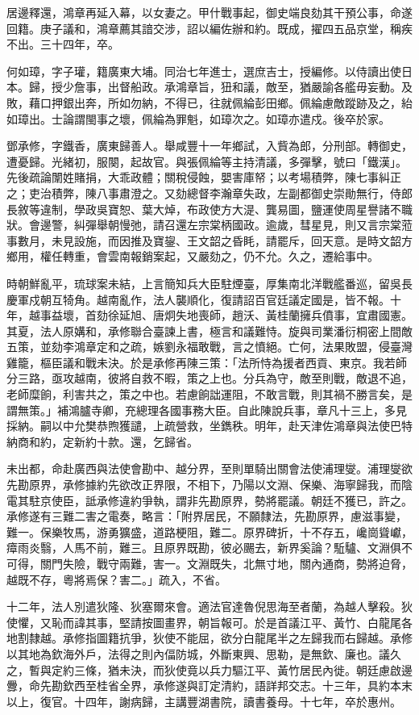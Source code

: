 \begin{pinyinscope}
居邊釋還，鴻章再延入幕，以女妻之。甲什戰事起，御史端良劾其干預公事，命遂回籍。庚子議和，鴻章薦其諳交涉，詔以編佐辦和約。既成，擢四五品京堂，稱疾不出。三十四年，卒。

何如璋，字子瓘，籍廣東大埔。同治七年進士，選庶吉士，授編修。以侍讀出使日本。歸，授少詹事，出督船政。承鴻章旨，狃和議，敵至，猶嚴諭各艦毋妄動。及敗，藉口押銀出奔，所如勿納，不得已，往就佩綸彭田鄉。佩綸慮敵蹤跡及之，紿如璋出。士論謂閩事之壞，佩綸為罪魁，如璋次之。如璋亦遣戍。後卒於家。

鄧承修，字鐵香，廣東歸善人。舉咸豐十一年鄉試，入貲為郎，分刑部。轉御史，遭憂歸。光緒初，服闋，起故官。與張佩綸等主持清議，多彈擊，號曰「鐵漢」。先後疏論闈姓賭捐，大乖政體；關稅侵蝕，嬰害庫帑；以考場積弊，陳七事糾正之；吏治積弊，陳八事肅澄之。又劾總督李瀚章失政，左副都御史崇勛無行，侍郎長敘等違制，學政吳寶恕、葉大焯，布政使方大湜、龔易圖，鹽運使周星譽諸不職狀。會邊警，糾彈舉朝慢弛，請召還左宗棠柄國政。逾歲，彗星見，則又言宗棠蒞事數月，未見設施，而因推及寶鋆、王文韶之昏眊，請罷斥，回天意。是時文韶方鄉用，權任轉重，會雲南報銷案起，又嚴劾之，仍不允。久之，遷給事中。

時朝鮮亂平，琉球案未結，上言簡知兵大臣駐煙臺，厚集南北洋戰艦番巡，留吳長慶軍戍朝互犄角。越南亂作，法人襲順化，復請詔百官廷議定國是，皆不報。十年，越事益壞，首劾徐延旭、唐炯失地喪師，趙沃、黃桂蘭擁兵僨事，宜肅國憲。其夏，法人原媾和，承修聯合臺諫上書，極言和議難恃。旋與司業潘衍桐密上間敵五策，並劾李鴻章定和之疏，嫉劉永福敢戰，言之憤絕。亡何，法果敗盟，侵臺灣雞籠，樞臣議和戰未決。於是承修再陳三策：「法所恃為援者西貢、東京。我若師分三路，亟攻越南，彼將自救不暇，策之上也。分兵為守，敵至則戰，敵退不追，老師糜餉，利害共之，策之中也。若慮餉詘運阻，不敢言戰，則其禍不勝言矣，是謂無策。」補鴻臚寺卿，充總理各國事務大臣。自此陳說兵事，章凡十三上，多見採納。嗣以中允樊恭煦獲譴，上疏營救，坐鐫秩。明年，赴天津佐鴻章與法使巴特納商和約，定新約十款。還，乞歸省。

未出都，命赴廣西與法使會勘中、越分界，至則單騎出關會法使浦理燮。浦理燮欲先勘原界，承修據約先欲改正界限，不相下，乃陽以文淵、保樂、海寧歸我，而陰電其駐京使臣，詆承修違約爭執，謂非先勘原界，勢將罷議。朝廷不獲已，許之。承修遂有三難二害之電奏，略言：「附界居民，不願隸法，先勘原界，慮滋事變，難一。保樂牧馬，游勇獷盛，道路梗阻，難二。原界碑折，十不存五，巉崗聳巘，瘴雨炎翳，人馬不前，難三。且原界既勘，彼必颺去，新界奚論？駈驢、文淵俱不可得，關門失險，戰守兩難，害一。文淵既失，北無寸地，關內通商，勢將迫脅，越既不存，粵將焉保？害二。」疏入，不省。

十二年，法人別遣狄隆、狄塞爾來會。適法官達魯倪思海至者蘭，為越人擊殺。狄使懼，又恥而諱其事，堅請按圖畫界，朝旨報可。於是首議江平、黃竹、白龍尾各地割隸越。承修指圖籍抗爭，狄使不能屈，欲分白龍尾半之左歸我而右歸越。承修以其地為欽海外戶，法得之則內偪防城，外斷東興、思勒，是無欽、廉也。議久之，暫與定約三條，猶未決，而狄使竟以兵力驅江平、黃竹居民內徙。朝廷慮啟邊釁，命先勘欽西至桂省全界，承修遂與訂定清約，語詳邦交志。十三年，具約本末以上，復官。十四年，謝病歸，主講豐湖書院，讀書養母。十七年，卒於惠州。


\end{pinyinscope}
